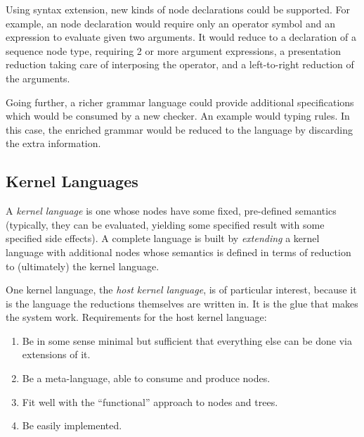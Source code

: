 Using syntax extension, new kinds of node declarations could be supported. For example, an  node declaration would require only an operator symbol and an expression to evaluate given two arguments. It would reduce to a declaration of a sequence node type,  requiring 2 or more argument expressions, a presentation reduction taking care of interposing the operator, and a left-to-right reduction of the arguments. 

Going further, a richer grammar language could provide additional specifications which would be consumed by a new checker. An example would typing rules. In this case, the enriched grammar would be reduced to the  language by discarding the extra information.


\subsection{Kernel Languages}
A \emph{kernel language} is one whose nodes have some fixed, pre-defined semantics (typically, they can be evaluated, yielding some specified result with some specified side effects). A complete language is built by \emph{extending} a kernel language with additional nodes whose semantics is defined in terms of reduction to (ultimately) the kernel language.


One kernel language, the \emph{host kernel language}, is of particular interest, because it is the language the reductions themselves are written in. It is the glue that makes the system work. Requirements for the host kernel language:
\begin{enumerate}
\item Be in some sense minimal but sufficient that everything else can be done via extensions of it.
\item Be a meta-language, able to consume and produce nodes.
\item Fit well with the ``functional'' approach to nodes and trees.
\item Be easily implemented.
\end{enumerate}

